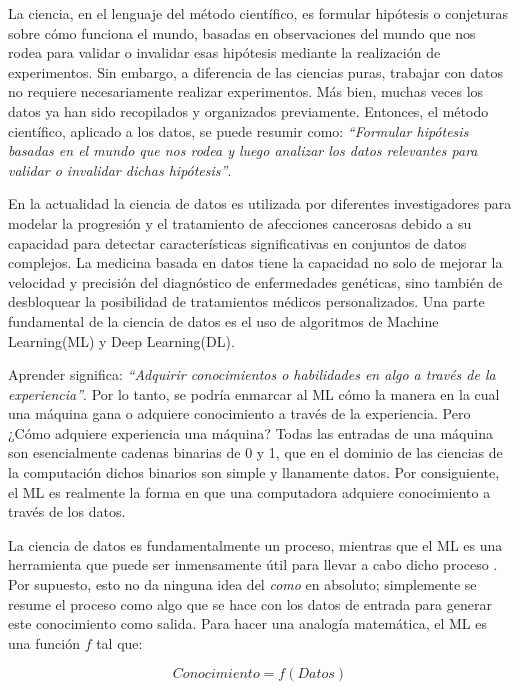 La ciencia, en el lenguaje del método científico, es formular hipótesis o conjeturas sobre cómo funciona el mundo, basadas en observaciones del mundo que nos rodea para validar o invalidar esas hipótesis mediante la realización de experimentos. Sin embargo, a diferencia de las ciencias puras, trabajar con datos no requiere necesariamente realizar experimentos. Más bien, muchas veces los datos ya han sido recopilados y organizados previamente. Entonces, el método científico, aplicado a los datos, se puede resumir como: \textit{“Formular hipótesis basadas en el mundo que nos rodea y luego analizar los datos relevantes para validar o invalidar dichas hipótesis”}. 

En la actualidad la ciencia de datos es utilizada por diferentes investigadores para modelar la progresión y el tratamiento de afecciones cancerosas debido a su capacidad para detectar características significativas en conjuntos de datos complejos. La medicina basada en datos tiene la capacidad no solo de mejorar la velocidad y precisión del diagnóstico de enfermedades genéticas, sino también de desbloquear la posibilidad de tratamientos médicos personalizados\citep{Baker2018}. Una parte fundamental de la ciencia de datos es el uso de algoritmos de Machine Learning(ML) y Deep Learning(DL).

Aprender significa: \textit{“Adquirir conocimientos o habilidades en algo a través de la experiencia”}.  Por lo tanto, se podría enmarcar al ML cómo la manera en la cual una máquina gana o adquiere conocimiento a través de la experiencia. Pero ¿Cómo adquiere experiencia una máquina? Todas las entradas de una máquina son esencialmente cadenas binarias de 0 y 1, que en el dominio de las ciencias de la computación dichos binarios son simple y llanamente datos. Por consiguiente, el ML es realmente la forma en que una computadora adquiere conocimiento a través de los datos.  

La ciencia de datos es fundamentalmente un proceso, mientras que el ML es una herramienta que puede ser inmensamente útil para llevar a cabo dicho proceso \citep{Pillai2020}. Por supuesto, esto no da ninguna idea del \textit{como} en absoluto; simplemente se resume el proceso como algo que se hace con los datos de entrada para generar este conocimiento como salida. Para hacer una analogía matemática, el ML es una función $f$ tal que:

\begin{equation}
Conocimiento=f(Datos)
\end{equation}

